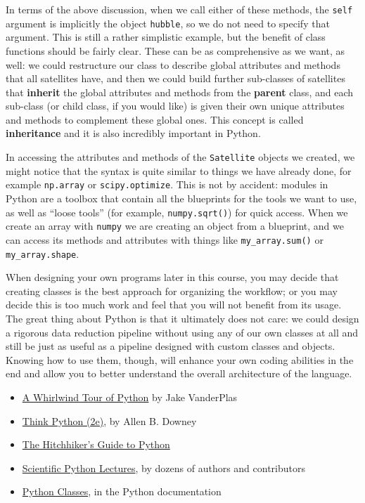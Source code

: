 \documentclass{tufte-book}
\begin{document}
In terms of the above discussion, when we call either of these methods, the \verb|self| argument is implicitly the object \verb|hubble|, so we do not need to specify that argument. This is still a rather simplistic example, but the benefit of class functions should be fairly clear. These can be as comprehensive as we want, as well: we could restructure our class to describe global attributes and methods that all satellites have, and then we could build further sub-classes of satellites that \textbf{inherit} the global attributes and methods from the \textbf{parent} class, and each sub-class (or child class, if you would like) is given their own unique attributes and methods to complement these global ones. This concept is called \textbf{inheritance} and it is also incredibly important in Python.

In accessing the attributes and methods of the \verb|Satellite| objects we created, we might notice that the syntax is quite similar to things we have already done,  for example \verb|np.array| or \verb|scipy.optimize|. This is not by accident: modules in Python are a toolbox that contain all the blueprints for the tools we want to use, as well as ``loose tools'' (for example, \verb|numpy.sqrt()|) for quick access. When we create an array with \verb|numpy| we are creating an object from a blueprint, and we can access its methods and attributes with things like \verb|my_array.sum()| or \verb|my_array.shape|. 

When designing your own programs later in this course, you may decide that creating classes is the best approach for organizing the workflow; or you may decide this is too much work and feel that you will not benefit from its usage. The great thing about Python is that it ultimately does not care: we could design a rigorous data reduction pipeline without using any of our own classes at all and still be just as useful as a pipeline designed with custom classes and objects. Knowing how to use them, though, will enhance your own coding abilities in the end and allow you to better understand the overall architecture of the language.  

\begin{itemize}
    \item \href{https://jakevdp.github.io/WhirlwindTourOfPython/}{A Whirlwind Tour of Python} by Jake VanderPlas
    \item \href{https://greenteapress.com/wp/think-python-2e/}{Think Python (2e)}, by Allen B. Downey
    \item \href{https://python-guide.readthedocs.io/en/latest/}{The Hitchhiker's Guide to Python}
    \item \href{https://lectures.scientific-python.org/}{Scientific Python Lectures}, by dozens of authors and contributors
    \item \href{https://docs.python.org/3/tutorial/classes.html#}{Python Classes}, in the Python documentation
\end{itemize}
\end{document}
